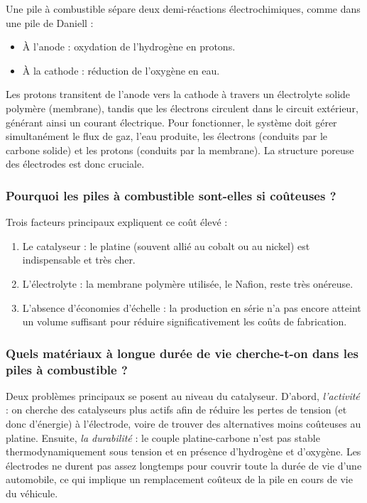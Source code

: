 Une pile à combustible sépare deux demi-réactions électrochimiques, comme dans une pile de Daniell :
\begin{itemize}
    \item À l'anode : oxydation de l'hydrogène en protons.
    \item À la cathode : réduction de l'oxygène en eau.
\end{itemize}
Les protons transitent de l'anode vers la cathode à travers un électrolyte solide polymère (membrane), tandis que les électrons circulent dans le circuit extérieur, générant ainsi un courant électrique. Pour fonctionner, le système doit gérer simultanément le flux de gaz, l'eau produite, les électrons (conduits par le carbone solide) et les protons (conduits par la membrane). La structure poreuse des électrodes est donc cruciale.

\subsubsection{Pourquoi les piles à combustible sont-elles si coûteuses ?}

Trois facteurs principaux expliquent ce coût élevé :
\begin{enumerate}
    \item Le catalyseur : le platine (souvent allié au cobalt ou au nickel) est indispensable et très cher.
    \item L'électrolyte : la membrane polymère utilisée, le Nafion, reste très onéreuse.
    \item L'absence d'économies d'échelle : la production en série n'a pas encore atteint un volume suffisant pour réduire significativement les coûts de fabrication.
\end{enumerate}

\subsubsection{Quels matériaux à longue durée de vie cherche-t-on dans les piles à combustible ?}

Deux problèmes principaux se posent au niveau du catalyseur. D'abord, \textit{l'activité} : on cherche des catalyseurs plus actifs afin de réduire les pertes de tension (et donc d'énergie) à l'électrode, voire de trouver des alternatives moins coûteuses au platine. Ensuite, \textit{la durabilité} : le couple platine-carbone n'est pas stable thermodynamiquement sous tension et en présence d'hydrogène et d'oxygène. Les électrodes ne durent pas assez longtemps pour couvrir toute la durée de vie d'une automobile, ce qui implique un remplacement coûteux de la pile en cours de vie du véhicule.

